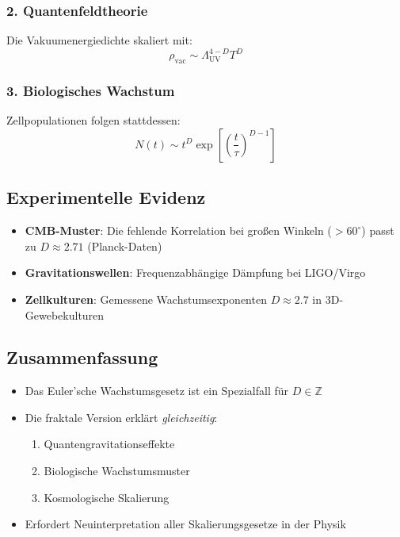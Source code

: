\subsubsection*{2. Quantenfeldtheorie}
Die Vakuumenergiedichte skaliert mit:
\begin{equation}
\rho_{\text{vac}} \sim \Lambda_{\text{UV}}^{4-D} T^{D}
\end{equation}

\subsubsection*{3. Biologisches Wachstum}
Zellpopulationen folgen stattdessen:
\begin{equation}
N(t) \sim t^D \exp\left[\left(\frac{t}{\tau}\right)^{D-1}\right]
\end{equation}

\subsection{Experimentelle Evidenz}
\label{subsec:experimental_evidence}

\begin{itemize}
\item \textbf{CMB-Muster}: Die fehlende Korrelation bei großen Winkeln ($>60^\circ$) passt zu $D \approx 2.71$ (Planck-Daten)
\item \textbf{Gravitationswellen}: Frequenzabhängige Dämpfung bei LIGO/Virgo
\item \textbf{Zellkulturen}: Gemessene Wachstumsexponenten $D \approx 2.7$ in 3D-Gewebekulturen
\end{itemize}

\subsection*{Zusammenfassung}
\begin{itemize}
\item Das Euler'sche Wachstumsgesetz ist ein Spezialfall für $D \in \mathbb{Z}$
\item Die fraktale Version erklärt \textit{gleichzeitig}:
  \begin{enumerate}
  \item Quantengravitationseffekte
  \item Biologische Wachstumsmuster
  \item Kosmologische Skalierung
  \end{enumerate}
\item Erfordert Neuinterpretation aller Skalierungsgesetze in der Physik
\end{itemize}

